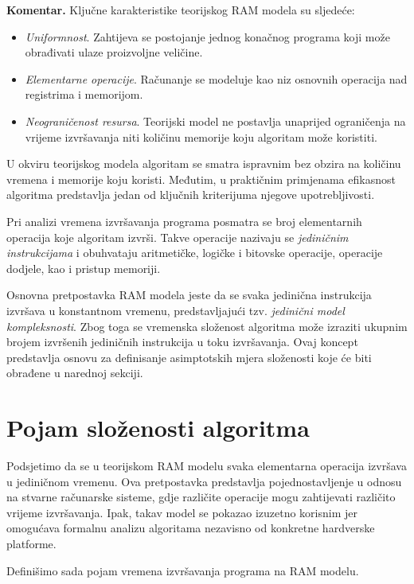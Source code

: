 \textbf{Komentar.} Ključne karakteristike teorijskog RAM modela su sljedeće:

\begin{itemize}
	\item \textit{Uniformnost}. Zahtijeva se postojanje jednog konačnog programa koji može obrađivati ulaze proizvoljne veličine.
	
	\item \textit{Elementarne operacije}. Računanje se modeluje kao niz osnovnih operacija nad registrima i memorijom.
	
	\item \textit{Neograničenost resursa}. Teorijski model ne postavlja unaprijed ograničenja na vrijeme izvršavanja niti količinu memorije koju algoritam može koristiti.
\end{itemize}

U okviru teorijskog modela algoritam se smatra ispravnim bez obzira na količinu vremena i memorije koju koristi. Međutim, u praktičnim primjenama efikasnost algoritma predstavlja jedan od ključnih kriterijuma njegove upotrebljivosti.

Pri analizi vremena izvršavanja programa posmatra se broj elementarnih operacija koje algoritam izvrši. Takve operacije nazivaju se \textit{jediničnim instrukcijama} i obuhvataju aritmetičke, logičke i bitovske operacije, operacije dodjele, kao i pristup memoriji.

Osnovna pretpostavka RAM modela jeste da se svaka jedinična instrukcija izvršava u konstantnom vremenu, predstavljajući tzv. \textit{jedinični model kompleksnosti}.  Zbog toga se vremenska složenost algoritma može izraziti ukupnim brojem izvršenih jediničnih instrukcija u toku izvršavanja. Ovaj koncept predstavlja osnovu za definisanje asimptotskih mjera složenosti koje će biti obrađene u narednoj sekciji.

\section{Pojam složenosti algoritma}

Podsjetimo da se u teorijskom RAM modelu svaka elementarna operacija izvršava u jediničnom vremenu. Ova pretpostavka predstavlja pojednostavljenje u odnosu na stvarne računarske sisteme, gdje različite operacije mogu zahtijevati različito vrijeme izvršavanja. Ipak, takav model se pokazao izuzetno korisnim jer omogućava formalnu analizu algoritama nezavisno od konkretne hardverske platforme.

Definišimo sada pojam vremena izvršavanja programa na RAM modelu.

